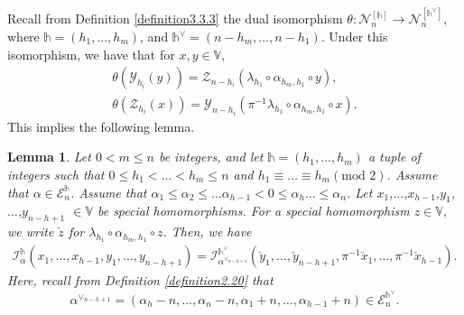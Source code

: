 \documentclass[11pt,oneside]{amsart}
\theoremstyle{plain}
\newtheorem{lemma}[theorem]{Lemma}
\theoremstyle{definition}
\theoremstyle{remark}
\newcommand{\tx}[1]{\text{#1}}
\newcommand{\BV}{{\mathbb V}}
\newcommand{\CE}{{\mathcal E}}
\newcommand{\CI}{{\mathcal I}}
\newcommand{\CN}{{\mathcal N}}
\newcommand{\CY}{{\mathcal Y}}
\newcommand{\CZ}{{\mathcal Z}}
\numberwithin{equation}{section}
\begin{document}
	Recall from Definition \ref{definition3.3.3} the dual isomorphism $\theta:\CN_n^{[\mathds{h}]} \rightarrow \CN_n^{[\mathds{h}^{\vee}]}$, where $\mathds{h}=(h_1,\dots,h_m)$, and $\mathds{h}^{\vee}=(n-h_m,\dots,n-h_1)$. Under this isomorphism, we have that for $x,y \in \BV$,
	\begin{equation*}\begin{array}{l}
			\theta(\CY_{h_i}(y))=\CZ_{n-h_i}(\lambda_{h_1} \circ \alpha_{h_m,h_1}\circ y),\\
			\theta(\CZ_{h_i}(x))=\CY_{n-h_i}(\pi^{-1}\lambda_{h_1} \circ \alpha_{h_m,h_1}\circ x).
		\end{array}
	\end{equation*}
	This implies the following lemma.
	
	\begin{lemma}\label{lemma3.12}
		Let $0 < m \leq n$ be integers, and let $\mathds{h}=(h_1,\dots,h_m)$ a tuple of integers such that $0\leq h_1<\dots<h_m \leq n$ and $h_1 \equiv \dots \equiv h_m (\tx{mod } 2)$. Assume that $\alpha \in \CE_n^{\mathds{h}}$. Assume that $\alpha_1 \leq \alpha_2\leq \dots \alpha_{h-1} < 0 \leq \alpha_h \dots \leq \alpha_n$. Let $x_1$,$\dots$,$x_{h-1}$,$y_1$,$\dots$,$y_{n-h+1}$ $\in \BV$ be special homomorphisms. For a special homomorphism $z \in \BV$, we write $\check{z}$ for $\lambda_{h_1} \circ \alpha_{h_m,h_1}\circ z$. Then, we have
		\begin{equation*}\begin{array}{l}
				\CI_{\alpha}^{\mathds{h}}(x_1,\dots,x_{h-1},y_1,\dots,y_{n-h+1})
				=\CI_{\alpha^{\vee_{n-h+1}}}^{\mathds{h}^{\vee}}(\check{y}_1,\dots,\check{y}_{n-h+1},\pi^{-1}\check{x}_1,\dots,\pi^{-1}\check{x}_{h-1}).
			\end{array}
		\end{equation*}
		Here, recall from Definition \ref{definition2.20} that
		\begin{equation*}
			\alpha^{\vee_{n-h+1}}=(\alpha_h-n,\dots,\alpha_{n}-n,\alpha_1+n,\dots,\alpha_{h-1}+n) \in \CE_n^{\mathds{h}^{\vee}}.
		\end{equation*}
	\end{lemma}
	
\end{document}
